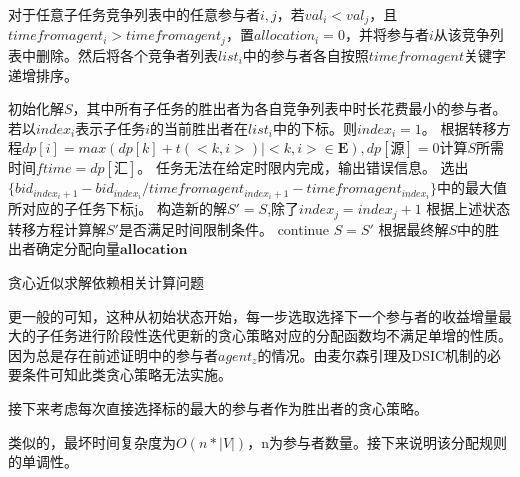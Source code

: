 \documentclass[promaster]{thesis-uestc}
\begin{document}
\begin{algorithm}[h]
    对于任意子任务竞争列表中的任意参与者$i,j$，若$val_i < val_j$，且$timefromagent_i > timefromagent_j$，置$allocation_i = 0$，并将参与者$i$从该竞争列表中删除。然后将各个竞争者列表$list_i$中的参与者各自按照$timefromagent$关键字递增排序。\;

    初始化解$S$，其中所有子任务的胜出者为各自竞争列表中时长花费最小的参与者。\;
    若以$index_i$表示子任务$i$的当前胜出者在$list_i$中的下标。则$index_i = 1$。\;
    根据转移方程$dp[i] = max(dp[k]+t(<k,i>)|<k,i> \in \mathbf{E}),dp[\text{源}] = 0$计算$S$所需时间$ftime = dp[\text{汇}]$。\;
    {
        任务无法在给定时限内完成，输出错误信息。\;
    }
    {
        选出$\{bid_{index_i+1}-bid_{index_i}/timefromagent_{index_i+1}-timefromagent_{index_i}\}$中的最大值所对应的子任务下标j。\;
        构造新的解$S' = S$,除了$index_j = index_j+1$\;
        根据上述状态转移方程计算解$S'$是否满足时间限制条件。\;
        {
            continue\;
        }
        $S = S'$\;
    } 
    根据最终解$S$中的胜出者确定分配向量$\mathbf{allocation}$\;
\caption{贪心近似求解依赖相关计算问题}
\label{jichumoxing2tanxin}
\end{algorithm}

更一般的可知，这种从初始状态开始，每一步选取选择下一个参与者的收益增量最大的子任务进行阶段性迭代更新的贪心策略对应的分配函数均不满足单增的性质。因为总是存在前述证明中的参与者$agent_z$的情况。由麦尔森引理及DSIC机制的必要条件可知此类贪心策略无法实施。

接下来考虑每次直接选择标的最大的参与者作为胜出者的贪心策略。

类似的，最坏时间复杂度为$O(n*|V|)$，n为参与者数量。接下来说明该分配规则的单调性。
\end{document}
